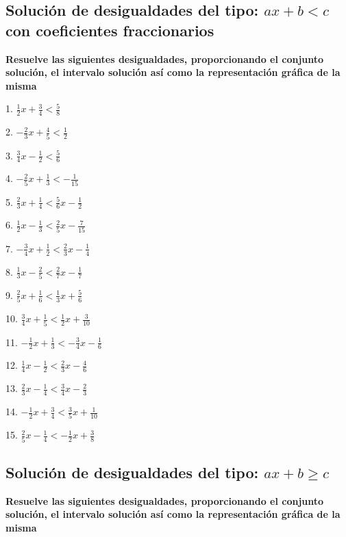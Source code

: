 \documentclass[]{book}
\begin{document}
\subsection{\texorpdfstring{Solución de desigualdades del tipo:
\(ax+b<c\) con coeficientes
fraccionarios}{Solución de desigualdades del tipo: ax+b\textless{}c con coeficientes fraccionarios}}\label{soluciuxf3n-de-desigualdades-del-tipo-axbc-con-coeficientes-fraccionarios-1}

\textbf{Resuelve las siguientes desigualdades, proporcionando el
conjunto solución, el intervalo solución así como la representación
gráfica de la misma}

\begin{multicols}{3}
1. $\frac{1}{2}x+\frac{3}{4}<\frac{5}{8}$

2. $-\frac{2}{3}x+\frac{4}{5}<\frac{1}{2}$

3. $\frac{3}{4}x-\frac{1}{2}<\frac{5}{6}$

4. $-\frac{2}{5}x+\frac{1}{3}<-\frac{1}{15}$

5. $\frac{2}{3}x+\frac{1}{4}<\frac{5}{6}x-\frac{1}{2}$

6. $\frac{1}{2}x-\frac{1}{3}<\frac{2}{5}x-\frac{7}{15}$

7. $-\frac{3}{4}x+\frac{1}{2}<\frac{2}{3}x-\frac{1}{4}$

8. $\frac{1}{3}x-\frac{2}{5}<\frac{2}{7}x-\frac{1}{7}$

9. $\frac{2}{5}x+\frac{1}{6}<\frac{1}{3}x+\frac{5}{6}$

10. $\frac{3}{4}x+\frac{1}{5}<\frac{1}{2}x+\frac{3}{10}$

11. $-\frac{1}{2}x+\frac{1}{3}<-\frac{3}{4}x-\frac{1}{6}$

12. $\frac{1}{4}x-\frac{1}{2}<\frac{2}{3}x-\frac{4}{6}$

13. $\frac{2}{3}x-\frac{1}{4}<\frac{3}{4}x-\frac{2}{3}$

14. $-\frac{1}{2}x+\frac{3}{4}<\frac{3}{5}x+\frac{1}{10}$

15. $\frac{2}{5}x-\frac{1}{4}<-\frac{1}{2}x+\frac{3}{8}$
\end{multicols}

\subsection{\texorpdfstring{Solución de desigualdades del tipo:
\(ax+b \geq c\)}{Solución de desigualdades del tipo: ax+b \textbackslash{}geq c}}\label{soluciuxf3n-de-desigualdades-del-tipo-axb-geq-c}

\textbf{Resuelve las siguientes desigualdades, proporcionando el
conjunto solución, el intervalo solución así como la representación
gráfica de la misma}
\end{document}
